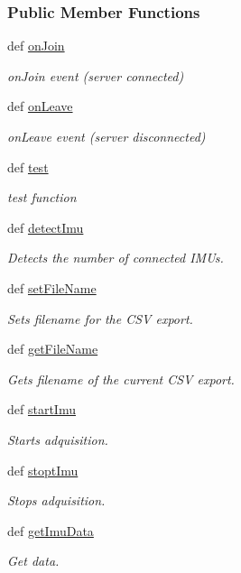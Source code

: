 \subsubsection*{Public Member Functions}
\begin{DoxyCompactItemize}
\item 
def \hyperlink{classserver_1_1_imu_af62e172c10fa382486a07c094adeaade}{on\-Join}
\begin{DoxyCompactList}\small\item\em on\-Join event (server connected) \end{DoxyCompactList}\item 
def \hyperlink{classserver_1_1_imu_a686e73f3cefe0b4a88623c68c3c49b2b}{on\-Leave}
\begin{DoxyCompactList}\small\item\em on\-Leave event (server disconnected) \end{DoxyCompactList}\item 
def \hyperlink{classserver_1_1_imu_a4bfc4c8632b7769ca36a773c0b39df92}{test}
\begin{DoxyCompactList}\small\item\em test function \end{DoxyCompactList}\item 
def \hyperlink{classserver_1_1_imu_ae090cee2a3aee7b1d9877357610b437c}{detect\-Imu}
\begin{DoxyCompactList}\small\item\em Detects the number of connected I\-M\-Us. \end{DoxyCompactList}\item 
def \hyperlink{classserver_1_1_imu_af407376e859abff47424fc4c2da7ea91}{set\-File\-Name}
\begin{DoxyCompactList}\small\item\em Sets filename for the C\-S\-V export. \end{DoxyCompactList}\item 
def \hyperlink{classserver_1_1_imu_af7b1a72e0d05b31931b955c294f1833e}{get\-File\-Name}
\begin{DoxyCompactList}\small\item\em Gets filename of the current C\-S\-V export. \end{DoxyCompactList}\item 
def \hyperlink{classserver_1_1_imu_a6b47186b53a976f9f851fc3b5c86e9cd}{start\-Imu}
\begin{DoxyCompactList}\small\item\em Starts adquisition. \end{DoxyCompactList}\item 
def \hyperlink{classserver_1_1_imu_a5d7f85a7405e74aced2c68294dafd485}{stopt\-Imu}
\begin{DoxyCompactList}\small\item\em Stops adquisition. \end{DoxyCompactList}\item 
def \hyperlink{classserver_1_1_imu_a3d15181eb786a459ed006e97fcf2c7c0}{get\-Imu\-Data}
\begin{DoxyCompactList}\small\item\em Get data. \end{DoxyCompactList}\end{DoxyCompactItemize}
